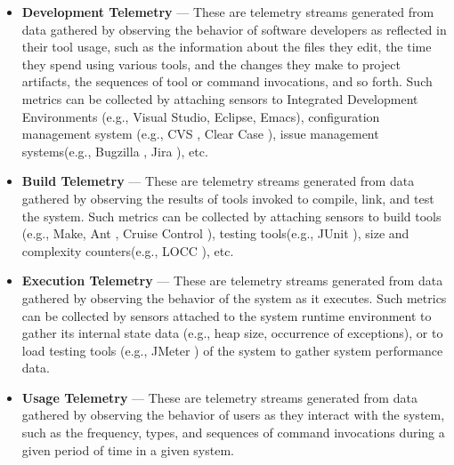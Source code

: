 \begin{itemize}
	\item \textbf{Development Telemetry} --- These are telemetry streams generated from data gathered by observing the behavior of software developers as reflected in their tool usage, such as the information about the files they edit, the time they spend using various tools, and the changes they make to project artifacts, the sequences of tool or command invocations, and so forth. Such metrics can be collected by attaching sensors to Integrated Development Environments (e.g., Visual Studio, Eclipse, Emacs), configuration management system (e.g., CVS \cite{Software:CVS}, Clear Case \cite{Software:ClearCase}), issue management systems(e.g., Bugzilla \cite{Software:Bugzilla}, Jira \cite{Software:Jira}), etc.
	
	\item \textbf{Build Telemetry} --- These are telemetry streams generated from data gathered by observing the results of tools invoked to compile, link, and test the system. Such metrics can be collected by attaching sensors to build tools (e.g., Make, Ant \cite{Software:Ant}, Cruise Control \cite{Software:CruiseControl}), testing tools(e.g., JUnit \cite{Software:JUnit}), size and complexity counters(e.g., LOCC \cite{Software:LOCC}), etc.
	
	\item \textbf{Execution Telemetry} --- These are telemetry streams generated from data gathered by observing the behavior of the system as it executes. Such metrics can be collected by sensors attached to the system runtime environment to gather its internal state data (e.g., heap size, occurrence of exceptions), or to load testing tools (e.g., JMeter \cite{Software:JMeter}) of the system to gather system performance data.
	
	\item \textbf{Usage Telemetry} --- These are telemetry streams generated from data gathered by observing the behavior of users as they interact with the system, such as the frequency, types, and sequences of command invocations during a given period of time in a given system.

\end{itemize}












